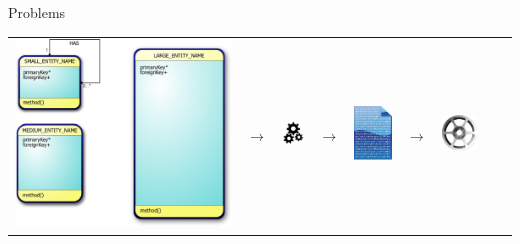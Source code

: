 \documentclass[table,15pt,t]{beamer}
\newcounter{i}
\begin{document}
\begin{frame}{Problems}
  \begin{tabularx}{\textwidth}{ccccccccc}
    \includegraphics[scale=0.06]{figs/model}
    & $\rightarrow$
    & \includegraphics[scale=1]{figs/gears}
    & $\rightarrow$
    & \includegraphics[scale=0.3]{figs/document}
    & $\rightarrow$
    & \includegraphics[scale=0.7]{figs/alloy}

\end{tabularx}
\end{frame}
\end{document}
